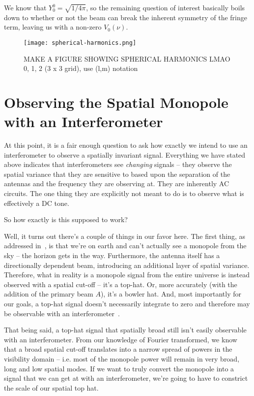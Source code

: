 We know that $Y_0^0 = \sqrt{1/4\pi}$, so the remaining question of interest 
basically boils down to whether or not the beam can break the inherent symmetry 
of the fringe term, leaving us with a non-zero $V_0(\nu)$.

\begin{figure}
    \begin{center}
    \texttt{[image: spherical-harmonics.png]}
    \end{center}
    \caption{
         MAKE A FIGURE SHOWING SPHERICAL HARMONICS LMAO
         0, 1, 2 (3 x 3 grid), use (l,m) notation
    }
    \label{fig:spherical-harmonics}
\end{figure}

\section{Observing the Spatial Monopole with an Interferometer}
\label{sec:observing-monopole}

At this point, it is a fair enough question to ask how exactly we intend to use 
an interferometer to observe a spatially invariant signal. Everything we have 
stated above indicates that interferometers see \emph{changing} signals -- they 
observe the spatial variance that they are sensitive to based upon the 
separation of the antennas and the frequency they are observing at. They are 
inherently AC circuits. The one thing they are explicitly not meant to do is to 
observe what is effectively a DC tone.

So how exactly is this supposed to work?

Well, it turns out there's a couple of things in our favor here. The first 
thing, as addressed in~\citet{presley2015}, is that we're on earth and can't 
actually see a monopole from the sky -- the horizon gets in the way.  
Furthermore, the antenna itself has a directionally dependent beam, introducing 
an additional layer of spatial variance. Therefore, what in reality is a 
monopole signal from the entire universe is instead observed with a spatial 
cut-off -- it's a top-hat.  Or, more accurately (with the addition of the 
primary beam $A$), it's a bowler hat. And, most importantly for our goals, a 
top-hat signal doesn't necessarily integrate to zero and therefore may be 
observable with an interferometer~\citep{venumadhav2016}.

That being said, a top-hat signal that spatially broad still isn't easily 
observable with an interferometer. From our knowledge of Fourier transformed, 
we know that a broad spatial cut-off translates into a narrow spread of powers 
in the visibility domain -- i.e. most of the monopole power will remain in very 
broad, long and low spatial modes. If we want to truly convert the monopole 
into a signal that we can get at with an interferometer, we're going to have to 
constrict the scale of our spatial top hat.

